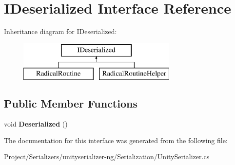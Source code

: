 \hypertarget{interface_i_deserialized}{}\section{I\+Deserialized Interface Reference}
\label{interface_i_deserialized}
Inheritance diagram for I\+Deserialized\+:\begin{figure}[H]
\begin{center}
\leavevmode
\includegraphics[height=2.000000cm]{interface_i_deserialized}
\end{center}
\end{figure}
\subsection*{Public Member Functions}
\begin{DoxyCompactItemize}
\item 
\mbox{\label{interface_i_deserialized_a87ea2dedb353ae446a8db2187819d184}} 
void {\bfseries Deserialized} ()
\end{DoxyCompactItemize}


The documentation for this interface was generated from the following file\+:\begin{DoxyCompactItemize}
\item 
Project/\+Serializers/unityserializer-\/ng/\+Serialization/Unity\+Serializer.\+cs\end{DoxyCompactItemize}
